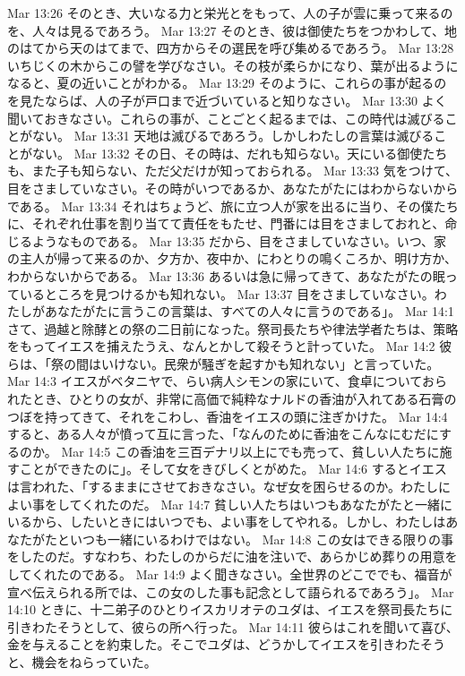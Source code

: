 Mar 13:26  そのとき、大いなる力と栄光とをもって、人の子が雲に乗って来るのを、人々は見るであろう。
Mar 13:27  そのとき、彼は御使たちをつかわして、地のはてから天のはてまで、四方からその選民を呼び集めるであろう。
Mar 13:28  いちじくの木からこの譬を学びなさい。その枝が柔らかになり、葉が出るようになると、夏の近いことがわかる。
Mar 13:29  そのように、これらの事が起るのを見たならば、人の子が戸口まで近づいていると知りなさい。
Mar 13:30  よく聞いておきなさい。これらの事が、ことごとく起るまでは、この時代は滅びることがない。
Mar 13:31  天地は滅びるであろう。しかしわたしの言葉は滅びることがない。
Mar 13:32  その日、その時は、だれも知らない。天にいる御使たちも、また子も知らない、ただ父だけが知っておられる。
Mar 13:33  気をつけて、目をさましていなさい。その時がいつであるか、あなたがたにはわからないからである。
Mar 13:34  それはちょうど、旅に立つ人が家を出るに当り、その僕たちに、それぞれ仕事を割り当てて責任をもたせ、門番には目をさましておれと、命じるようなものである。
Mar 13:35  だから、目をさましていなさい。いつ、家の主人が帰って来るのか、夕方か、夜中か、にわとりの鳴くころか、明け方か、わからないからである。
Mar 13:36  あるいは急に帰ってきて、あなたがたの眠っているところを見つけるかも知れない。
Mar 13:37  目をさましていなさい。わたしがあなたがたに言うこの言葉は、すべての人々に言うのである」。
Mar 14:1  さて、過越と除酵との祭の二日前になった。祭司長たちや律法学者たちは、策略をもってイエスを捕えたうえ、なんとかして殺そうと計っていた。
Mar 14:2  彼らは、「祭の間はいけない。民衆が騒ぎを起すかも知れない」と言っていた。
Mar 14:3  イエスがベタニヤで、らい病人シモンの家にいて、食卓についておられたとき、ひとりの女が、非常に高価で純粋なナルドの香油が入れてある石膏のつぼを持ってきて、それをこわし、香油をイエスの頭に注ぎかけた。
Mar 14:4  すると、ある人々が憤って互に言った、「なんのために香油をこんなにむだにするのか。
Mar 14:5  この香油を三百デナリ以上にでも売って、貧しい人たちに施すことができたのに」。そして女をきびしくとがめた。
Mar 14:6  するとイエスは言われた、「するままにさせておきなさい。なぜ女を困らせるのか。わたしによい事をしてくれたのだ。
Mar 14:7  貧しい人たちはいつもあなたがたと一緒にいるから、したいときにはいつでも、よい事をしてやれる。しかし、わたしはあなたがたといつも一緒にいるわけではない。
Mar 14:8  この女はできる限りの事をしたのだ。すなわち、わたしのからだに油を注いで、あらかじめ葬りの用意をしてくれたのである。
Mar 14:9  よく聞きなさい。全世界のどこででも、福音が宣べ伝えられる所では、この女のした事も記念として語られるであろう」。
Mar 14:10  ときに、十二弟子のひとりイスカリオテのユダは、イエスを祭司長たちに引きわたそうとして、彼らの所へ行った。
Mar 14:11  彼らはこれを聞いて喜び、金を与えることを約束した。そこでユダは、どうかしてイエスを引きわたそうと、機会をねらっていた。

